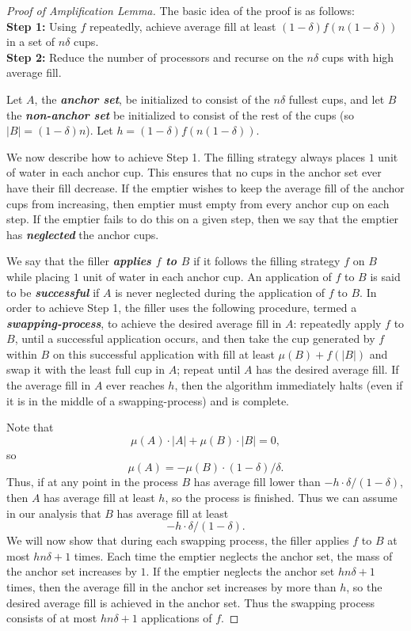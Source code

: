\documentclass[twocolumn]{article}[10pt]
\newcommand{\defn}[1]{{\textit{\textbf{\boldmath #1}}}\xspace}
\begin{document}
\begin{proof}[Proof of Amplification Lemma]
  The basic idea of the proof is as follows:\\
  \textbf{Step 1:} Using $f$ repeatedly, achieve average fill at least
  $(1-\delta) f(n(1-\delta))$ in a set of $n\delta$ cups. \\
  \textbf{Step 2:} Reduce the number of processors and recurse
  on the $n\delta$ cups with high average fill.

  Let $A$, the \defn{anchor set}, be initialized to consist of the $n\delta$
  fullest cups, and let $B$ the \defn{non-anchor set} be initialized to consist
  of the rest of the cups (so $|B| = (1-\delta)n$). Let $h =
  (1-\delta)f(n(1-\delta)).$

  We now describe how to achieve Step 1.
  The filling strategy always places $1$ unit of water in each anchor cup. This
  ensures that no cups in the anchor set ever have their fill decrease. If the emptier wishes to keep the average fill of the anchor cups from increasing, then emptier must empty from every anchor cup on each step. If the emptier fails to do this on a given step, then we say that the emptier has \defn{neglected} the anchor cups. 

  We say that the filler \defn{applies $f$ to $B$} if it follows the filling strategy $f$ on $B$ while placing $1$ unit of water in each anchor cup. An application of $f$ to $B$ is said to be \defn{successful} if $A$ is never neglected during the application of $f$ to $B$. In order to achieve Step 1, the filler uses the following procedure, termed a \defn{swapping-process}, to achieve the desired average fill in $A$: repeatedly apply $f$ to $B$, until a successful application occurs, and then take the cup generated by $f$ within $B$ on this successful application with fill at least $\mu(B) + f(|B|)$ and swap it with the least full cup in $A$; repeat until $A$ has the desired average fill. If the average fill in $A$ ever reaches $h$, then the algorithm immediately halts (even if it is in the middle of a swapping-process) and is complete.
  
  Note that $$\mu(A) \cdot |A| + \mu(B)\cdot |B| =
  0,$$ so $$\mu(A) = - \mu(B) \cdot (1-\delta)/ \delta.$$ 
  Thus, if at any point in the process $B$ has average fill lower than $-h
  \cdot \delta/(1-\delta)$, then $A$ has average fill at least $h$, so the
  process is finished. Thus we can assume in our analysis that $B$ has average fill at least 
  \begin{equation}
  -h\cdot\delta/(1-\delta).
  \label{eq:Batleast}
  \end{equation}
  We will now show that during each swapping process, the filler applies $f$ to $B$ at most $h n \delta + 1$ times. 
  Each time the emptier neglects the anchor set, the mass of the
  anchor set increases by $1$. If the emptier neglects the anchor set $h
  n\delta + 1$ times, then the average fill in the anchor set increases by
  more than $h$, so the desired average fill is achieved in the anchor set. Thus the swapping process consists of at most $hn\delta + 1$ applications of $f$.  


\end{proof}
\end{document}
